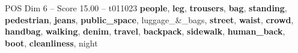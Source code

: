 \begin{textsample}{POS Dim 6 – Score 15.00 – t011023}  \label{ex:f6_pos_032}
\textbf{people}, \textbf{leg}, \textbf{trousers}, \textbf{bag}, \textbf{standing}, \textbf{pedestrian}, \textbf{jeans}, \textbf{public\_space}, luggage\_\&\_bags, \textbf{street}, \textbf{waist}, \textbf{crowd}, \textbf{handbag}, \textbf{walking}, \textbf{denim}, \textbf{travel}, \textbf{backpack}, \textbf{sidewalk}, \textbf{human\_back}, \textbf{boot}, \textbf{cleanliness}, night

\end{textsample}
